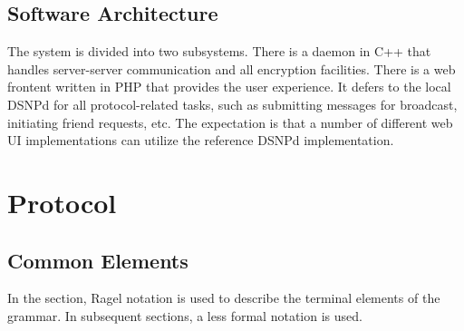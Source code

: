 \documentclass[letterpaper,11pt,oneside]{article}
\begin{document}
%
%

\subsection{Software Architecture}

The system is divided into two subsystems. There is a daemon in C++ that
handles server-server communication and all encryption facilities. There is a
web frontent written in PHP that provides the user experience. It defers to the
local DSNPd for all protocol-related tasks, such as submitting messages for
broadcast, initiating friend requests, etc. The expectation is that a number of
different web UI implementations can utilize the reference DSNPd
implementation.

\section{Protocol}

\subsection{Common Elements}

In the section, Ragel notation is used to describe the terminal elements of the
grammar. In subsequent sections, a less formal notation is used.
\end{document}
